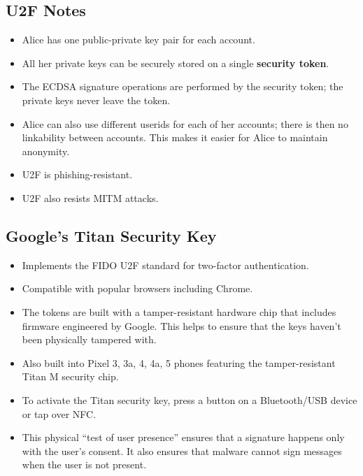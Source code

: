 \documentclass[12pt,titlepage]{article}
\begin{document}
\subsection{U2F Notes}
\begin{itemize}
	\item Alice has one public-private key pair for each account.
	\item All her private keys can be securely stored on a single \textbf{security token}.
	\item The ECDSA signature operations are performed by the security token; the private keys never leave the token.
	\item Alice can also use different userids for each of her accounts; there is then no linkability between accounts. This makes it easier for Alice to maintain anonymity.
	\item U2F is phishing-resistant.
	\item U2F also resists MITM attacks.
\end{itemize}
\subsection{Google’s Titan Security Key}
\begin{itemize}
	\item Implements the FIDO U2F standard for two-factor authentication.
	\item Compatible with popular browsers including Chrome.
	\item The tokens are built with a tamper-resistant hardware chip that includes firmware engineered by Google. This helps to ensure that the keys haven’t been physically tampered with.
	\item Also built into Pixel 3, 3a, 4, 4a, 5 phones featuring the tamper-resistant Titan M security chip.
	\item To activate the Titan security key, press a button on a Bluetooth/USB device or tap over NFC.
	\item This physical ``test of user presence'' ensures that a signature happens only with the user’s consent. It also ensures that malware cannot sign messages when the user is not present.
\end{itemize}
\end{document}
